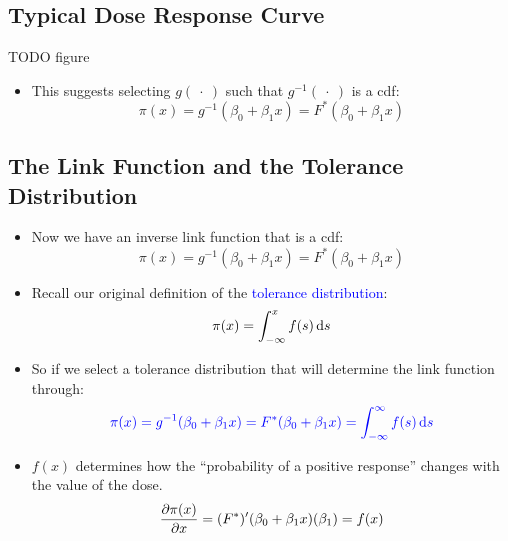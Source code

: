 \documentclass[oneside]{book}\usepackage[]{graphicx}\usepackage[svgnames]{xcolor}
\begin{document}
\subsection*{Typical Dose Response Curve}
TODO figure
\begin{itemize}
    \item This suggests selecting $ g(\:\cdot\:) $ such that $ g^{-1}(\:\cdot\:) $ is a cdf:
          \[ \pi(x)=g^{-1}(\beta_0+\beta_1x)=F^*(\beta_0+\beta_1x) \]
\end{itemize}
\subsection*{The Link Function and the Tolerance Distribution}
\begin{itemize}
    \item Now we have an inverse link function that is a cdf:
          \[ \pi(x)=g^{-1}(\beta_0+\beta_1x)=F^*(\beta_0+\beta_1x) \]
    \item Recall our original definition of the \textcolor{Blue}{tolerance distribution}:
          \[ \pi(x)=\int_{-\infty}^{x}f(s)\odif{s} \]
    \item So if we select a tolerance distribution that will determine the link function
          through:
          \[ \textcolor{Blue}{\pi(x)=g^{-1}(\beta_0+\beta_1x)=F^*(\beta_0+\beta_1x)=\int_{-\infty}^{\infty}f(s)\odif{s}} \]
    \item $ f(x) $ determines how the ``probability of a positive response'' changes with the value of the dose.
          \[ \pdv{\pi(x)}{x}=(F^*)^\prime (\beta_0+\beta_1x)(\beta_1)=f(x) \]
\end{itemize}
\end{document}
